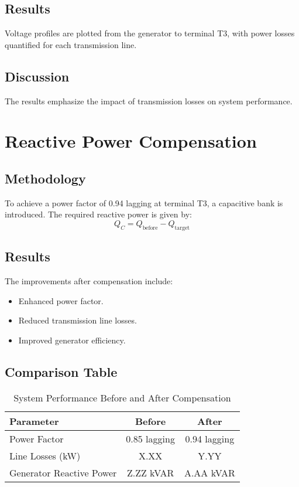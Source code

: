 \documentclass[conference]{IEEEtran}
\begin{document}
\subsection{Results}
Voltage profiles are plotted from the generator to terminal T3, with power losses quantified for each transmission line.

\subsection{Discussion}
The results emphasize the impact of transmission losses on system performance.

\section{Reactive Power Compensation}
\label{sec:compensation}
\subsection{Methodology}
To achieve a power factor of 0.94 lagging at terminal T3, a capacitive bank is introduced. The required reactive power is given by:
\begin{equation}
    Q_C = Q_{\text{before}} - Q_{\text{target}}
\end{equation}

\subsection{Results}
The improvements after compensation include:
\begin{itemize}
    \item Enhanced power factor.
    \item Reduced transmission line losses.
    \item Improved generator efficiency.
\end{itemize}

\subsection{Comparison Table}
\begin{table}[H]
\caption{System Performance Before and After Compensation}
\label{table:comparison}
\centering
\begin{tabular}{|l|c|c|}
\hline
\textbf{Parameter}         & \textbf{Before} & \textbf{After}  \\ \hline
Power Factor               & 0.85 lagging    & 0.94 lagging    \\ \hline
Line Losses (kW)           & X.XX            & Y.YY            \\ \hline
Generator Reactive Power   & Z.ZZ kVAR       & A.AA kVAR       \\ \hline
\end{tabular}
\end{table}
\end{document}
